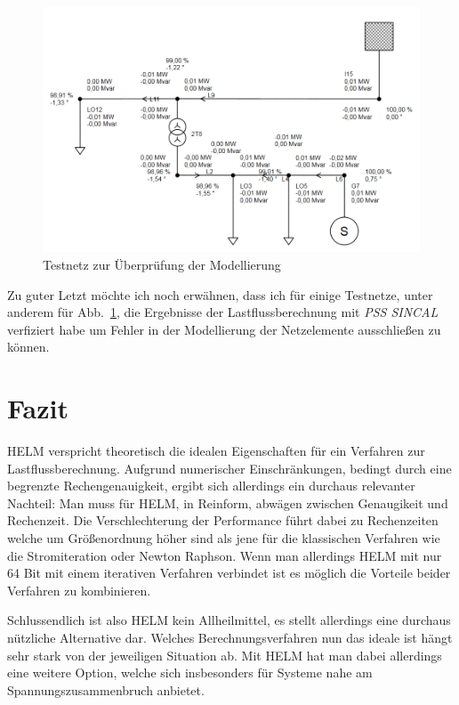 \documentclass[12pt,a4paper]{article}
\newcommand{\reffig}[1]{{Abb.~\ref{#1}}}
\begin{document}
	\begin{figure}
		\centering
		\includegraphics[scale=0.55]{pictures/complete_powernet_modified}
		\caption{Testnetz zur Überprüfung der Modellierung}
		\label{fig:powernet_complete}
	\end{figure}
	
	Zu guter Letzt möchte ich noch erwähnen, dass ich für einige Testnetze, unter anderem für \reffig{fig:powernet_complete}, die Ergebnisse der Lastflussberechnung mit \emph{PSS SINCAL} verfiziert habe um Fehler in der Modellierung der Netzelemente ausschließen zu können.
	
	\section{Fazit}
	HELM verspricht theoretisch die idealen Eigenschaften für ein Verfahren zur Lastflussberechnung. Aufgrund numerischer Einschränkungen, bedingt durch eine begrenzte Rechengenauigkeit, ergibt sich allerdings ein durchaus relevanter Nachteil: Man muss für HELM, in Reinform, abwägen zwischen Genaugikeit und Rechenzeit. Die Verschlechterung der Performance führt dabei zu Rechenzeiten welche um Größenordnung höher sind als jene für die klassischen Verfahren wie die Stromiteration oder Newton Raphson. Wenn man allerdings HELM mit nur 64 Bit mit einem iterativen Verfahren verbindet ist es möglich die Vorteile beider Verfahren zu kombinieren.
	
	Schlussendlich ist also HELM kein Allheilmittel, es stellt allerdings eine durchaus nützliche Alternative dar. Welches Berechnungsverfahren nun das ideale ist hängt sehr stark von der jeweiligen Situation ab. Mit HELM hat man dabei allerdings eine weitere Option, welche sich insbesonders für Systeme nahe am Spannungszusammenbruch anbietet.
	
\end{document}
